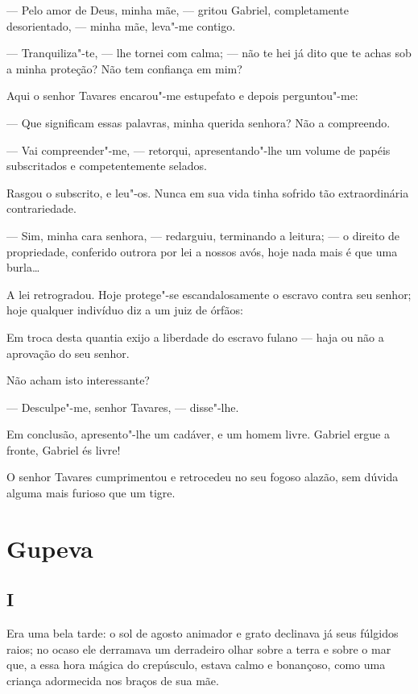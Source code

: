 --- Pelo amor de Deus, minha mãe, --- gritou Gabriel, completamente
desorientado, --- minha mãe, leva"-me contigo.

--- Tranquiliza"-te, --- lhe tornei com calma; --- não te hei já dito que
te achas sob a minha proteção? Não tem confiança em mim?

Aqui o senhor Tavares encarou"-me estupefato e depois perguntou"-me:

--- Que significam essas palavras, minha querida senhora? Não a
compreendo.

--- Vai compreender"-me, --- retorqui, apresentando"-lhe um volume de
papéis subscritados e competentemente selados.

Rasgou o subscrito, e leu"-os. Nunca em sua vida tinha sofrido tão
extraordinária contrariedade.

--- Sim, minha cara senhora, --- redarguiu, terminando a leitura; --- o
direito de propriedade, conferido outrora por lei a nossos avós, hoje
nada mais é que uma burla\ldots{}

A lei retrogradou. Hoje protege"-se escandalosamente o escravo contra seu
senhor; hoje qualquer indivíduo diz a um juiz de órfãos:

Em troca desta quantia exijo a liberdade do escravo fulano --- haja ou
não a aprovação do seu senhor.

Não acham isto interessante?

--- Desculpe"-me, senhor Tavares, --- disse"-lhe.

Em conclusão, apresento"-lhe um cadáver, e um homem livre. Gabriel ergue
a fronte, Gabriel és livre!

O senhor Tavares cumprimentou e retrocedeu no seu fogoso alazão, sem
dúvida alguma mais furioso que um tigre.

\chapter{Gupeva}

\section{I}

Era uma bela tarde: o sol de agosto animador e grato declinava já seus
fúlgidos raios; no ocaso ele derramava um derradeiro olhar sobre a terra
e sobre o mar que, a essa hora mágica do crepúsculo, estava calmo e
bonançoso, como uma criança adormecida nos braços de sua mãe.

